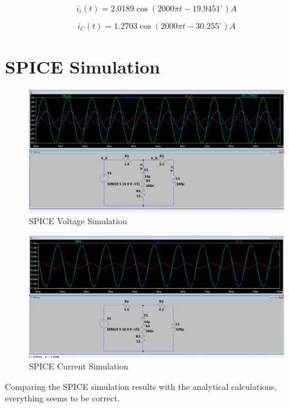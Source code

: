 \begin{equation}\label{eq:current-in-time}
    i_i(t) = 2.0189 \cos(2000\pi t - 19.9451^{\circ}) A
\end{equation}

\begin{equation}\label{eq:current-capacitor-time}
    i_C(t) = 1.2703 \cos(2000\pi t - 30.255^{\circ}) A
\end{equation}

\newpage
\thispagestyle{plain}

\section{SPICE Simulation}

\begin{figure}[h]
    \centering
    \includegraphics[width=1\textwidth]{assets/sim-voltage.png}
    \caption{SPICE Voltage Simulation}
    \label{fig:spice-circuit}
\end{figure}

\begin{figure}[h]
    \centering
    \includegraphics[width=1\textwidth]{assets/sim-current.png}
    \caption{SPICE Current Simulation}
    \label{fig:spice-circuit}
\end{figure}

Comparing the SPICE simulation results with the analytical calculations, everything seems to be correct.

